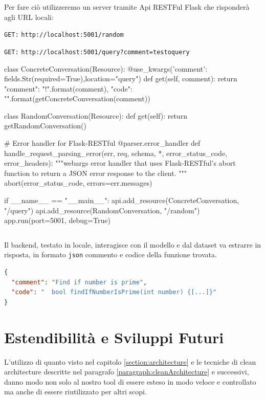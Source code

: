 Per fare ciò utilizzeremo un server tramite Api RESTFul Flask che risponderà agli URL locali:
\begin{description}
    \item \texttt{GET:} \texttt{http://localhost:5001/random} 
    \item \texttt{GET:} \texttt{http://localhost:5001/query?comment=testoquery} 
\end{description}

\begin{python}
class ConcreteConversation(Resource):
    @use_kwargs({'comment': fields.Str(required=True)},location="query")
    def get(self, comment):
        return {
            "comment": "{}!".format(comment),
            "code": "{}".format(getConcreteConversation(comment))
        }

class RandomConversation(Resource):
    def get(self):
        return getRandomConversation()

# Error handler for Flask-RESTful
@parser.error_handler
def handle_request_parsing_error(err, req, schema, *, error_status_code, error_headers):
    """webargs error handler that uses Flask-RESTful's abort function to return
    a JSON error response to the client.
    """
    abort(error_status_code, errors=err.messages)


if __name__ == "__main__":
    api.add_resource(ConcreteConversation, "/query")
    api.add_resource(RandomConversation, "/random")
    app.run(port=5001, debug=True)
\end{python}
\begin{lstlisting}[frame=none,caption={Un'estratto del codice per l'avvio del server backend in locale},captionpos=b,label=pythonbackendstart]
\end{lstlisting}

Il backend, testato in locale, interagisce con il modello e dal dataset va estrarre in risposta, in formato \texttt{json} commento e codice della funzione trovata.

\begin{lstlisting}[language=json,firstnumber=1]
{
  "comment": "Find if number is prime",
  "code": "  bool findIfNumberIsPrime(int number) {[...]}"
}
\end{lstlisting}
\newpage
\section{Estendibilità e Sviluppi Futuri}
L'utilizzo di quanto visto nel capitolo \ref{section:architecture} e le tecniche di clean architecture descritte nel paragrafo \ref{paragraph:cleanArchitecture} e successivi, danno modo non solo al nostro tool di essere esteso in modo veloce e controllato ma anche di essere riutilizzato per altri scopi. 

